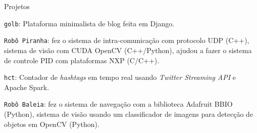 \documentclass[8pt]{resume}
\newcommand{\tit}[1]{\textit{#1}}
\newcommand{\ttt}[1]{\texttt{#1}}
\begin{document}
\begin{rSection}{Projetos}

\begin{rSubsection}{}{}{}{}
    \item \ttt{golb}: Plataforma minimalista de blog feita em Django.
    \item \ttt{Robô Piranha}:
        fez o sistema de intra-comunicação com protocolo UDP (C++),
        sistema de visão com CUDA OpenCV (C++/Python),
        ajudou a fazer o sistema de controle PID com plataformas NXP (C/C++).
    \item \ttt{hct}: Contador de \tit{hashtags} em tempo real usando
        \tit{Twitter Streaming API} e Apache Spark.
    \item \ttt{Robô Baleia}:
        fez o sistema de navegação com a biblioteca Adafruit BBIO (Python),
        sistema de visão usando um classificador de imagens para detecção
        de objetos em OpenCV (Python).
\end{rSubsection}

\end{rSection}
\end{document}
